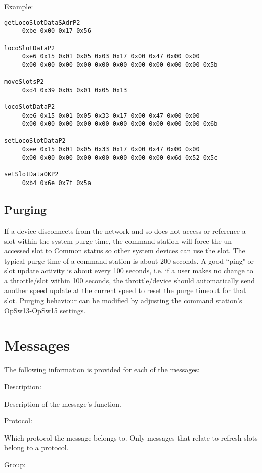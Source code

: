 Example:

\begin{verbatim}
getLocoSlotDataSAdrP2
     0xbe 0x00 0x17 0x56 
     
locoSlotDataP2
     0xe6 0x15 0x01 0x05 0x03 0x17 0x00 0x47 0x00 0x00 
     0x00 0x00 0x00 0x00 0x00 0x00 0x00 0x00 0x00 0x00 0x5b 

moveSlotsP2
     0xd4 0x39 0x05 0x01 0x05 0x13 

locoSlotDataP2
     0xe6 0x15 0x01 0x05 0x33 0x17 0x00 0x47 0x00 0x00 
     0x00 0x00 0x00 0x00 0x00 0x00 0x00 0x00 0x00 0x00 0x6b 

setLocoSlotDataP2
     0xee 0x15 0x01 0x05 0x33 0x17 0x00 0x47 0x00 0x00 
     0x00 0x00 0x00 0x00 0x00 0x00 0x00 0x00 0x6d 0x52 0x5c 

setSlotDataOKP2
     0xb4 0x6e 0x7f 0x5a 
\end{verbatim}
\normalsize

\subsection{Purging}
If a device disconnects from the network and so does not access or reference a slot within the system purge time, the command station will force the un-accessed slot to \gls{Common} status so other system devices can use the slot. The typical purge time of a command station is about 200 seconds. A good ``ping" or slot update activity is about every 100 seconds, i.e. if a user makes no change to a throttle/slot within 100 seconds, the throttle/device should automatically send another speed update at the current speed to reset the purge timeout for that slot. Purging behaviour can be modified by adjusting the command station's OpSw13-OpSw15 settings.

\newpage
\section{Messages}

The following information is provided for each of the messages:

\underline{Description:}

Description of the message's function.

\underline{Protocol:}

Which protocol the message belongs to. Only messages that relate to refresh slots belong to a protocol.

\underline{Group:}

